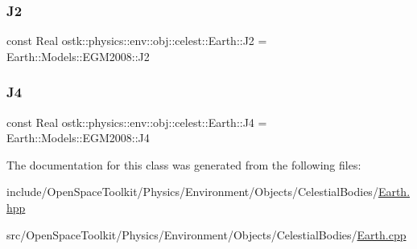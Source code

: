 \mbox{\label{classostk_1_1physics_1_1env_1_1obj_1_1celest_1_1_earth_a0c09ef7a4fb1f6d5d077e4108fb4e56a}} 
\subsubsection{\texorpdfstring{J2}{J2}}
{\footnotesize\ttfamily const Real ostk\+::physics\+::env\+::obj\+::celest\+::\+Earth\+::\+J2 = Earth\+::\+Models\+::\+E\+G\+M2008\+::\+J2\hspace{0.3cm}{\ttfamily [static]}}

\mbox{\label{classostk_1_1physics_1_1env_1_1obj_1_1celest_1_1_earth_a1bbb48f44c28957851d971e35b628a6b}} 
\subsubsection{\texorpdfstring{J4}{J4}}
{\footnotesize\ttfamily const Real ostk\+::physics\+::env\+::obj\+::celest\+::\+Earth\+::\+J4 = Earth\+::\+Models\+::\+E\+G\+M2008\+::\+J4\hspace{0.3cm}{\ttfamily [static]}}



The documentation for this class was generated from the following files\+:\begin{DoxyCompactItemize}
\item 
include/\+Open\+Space\+Toolkit/\+Physics/\+Environment/\+Objects/\+Celestial\+Bodies/\hyperlink{_objects_2_celestial_bodies_2_earth_8hpp}{Earth.\+hpp}\item 
src/\+Open\+Space\+Toolkit/\+Physics/\+Environment/\+Objects/\+Celestial\+Bodies/\hyperlink{_objects_2_celestial_bodies_2_earth_8cpp}{Earth.\+cpp}\end{DoxyCompactItemize}
